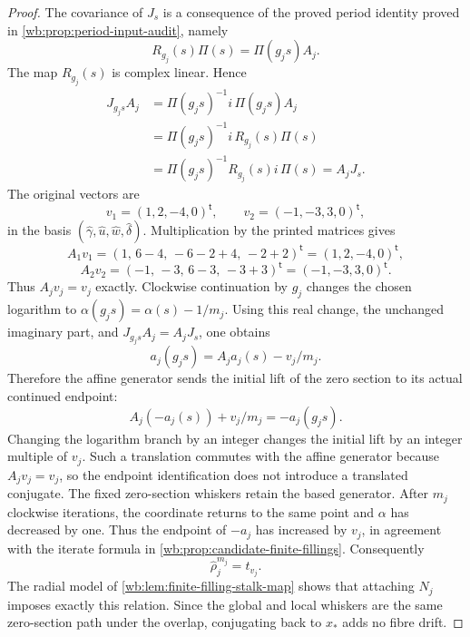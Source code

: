 \begin{proof}
The covariance of \(J_s\) is a consequence of the proved period
identity proved in \cref{wb:prop:period-input-audit}, namely
\[
 R_{g_j}(s)\Pi(s)=\Pi(g_js)A_j.
\]
The map \(R_{g_j}(s)\) is complex linear.  Hence
\[
 \begin{split}
 J_{g_js}A_j
 &=\Pi(g_js)^{-1}i\,\Pi(g_js)A_j\\
 &=\Pi(g_js)^{-1}i\,R_{g_j}(s)\Pi(s)\\
 &=\Pi(g_js)^{-1}R_{g_j}(s)i\,\Pi(s)
 =A_jJ_s.
 \end{split}
\]
The original vectors are
\[
 v_1=(1,2,-4,0)^{\mathsf t},\qquad
 v_2=(-1,-3,3,0)^{\mathsf t},
\]
in the basis
\((\widehat\gamma,\widehat u,\widehat w,\widehat\delta)\).
Multiplication by the printed matrices gives
\[
 A_1v_1=(1,\,6-4,\,-6-2+4,\,-2+2)^{\mathsf t}
        =(1,2,-4,0)^{\mathsf t},
\]
\[
 A_2v_2=(-1,\,-3,\,6-3,\,-3+3)^{\mathsf t}
        =(-1,-3,3,0)^{\mathsf t}.
\]
Thus \(A_jv_j=v_j\) exactly.  Clockwise continuation by \(g_j\)
changes the chosen logarithm to
\(\alpha(g_js)=\alpha(s)-1/m_j\).  Using this real change, the
unchanged imaginary part, and \(J_{g_js}A_j=A_jJ_s\), one obtains
\[
 a_j(g_js)=A_ja_j(s)-v_j/m_j.
\]
Therefore the affine generator sends the initial lift of the
zero section to its actual continued endpoint:
\[
 A_j(-a_j(s))+v_j/m_j=-a_j(g_js).
\]
Changing the logarithm branch by an integer changes the initial
lift by an integer multiple of \(v_j\).  Such a translation
commutes with the affine generator because \(A_jv_j=v_j\), so the
endpoint identification does not introduce a translated conjugate.
The fixed zero-section whiskers retain the based generator.
After \(m_j\) clockwise iterations, the coordinate returns to the
same point and \(\alpha\) has decreased by one.  Thus the endpoint
of \(-a_j\) has increased by \(v_j\), in agreement with the iterate formula in \cref{wb:prop:candidate-finite-fillings}.
Consequently
\[
 \widehat\rho_j^{m_j}=t_{v_j}.
 \tag{IL.5.23b}
\]
The radial model of \cref{wb:lem:finite-filling-stalk-map} shows that attaching
\(N_j\) imposes exactly this relation.  Since the global and local whiskers
are the same zero-section path under the overlap, conjugating back to
\(x_*\) adds no fibre drift.


\end{proof}
